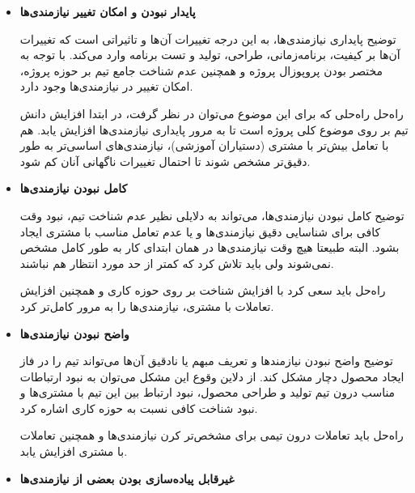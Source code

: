 \begin{itemize}
	
	\item
	\textbf{پایدار نبودن و امکان تغییر نیازمندی‌ها}
	
	
	توضیح \hspace*{1cm}  پایداری نیازمندی‌ها، به این درجه تغییرات آن‌ها و تاثیراتی است که تغییرات آن‌ها بر کیفیت، برنامه‌زمانی، طراحی، تولید و تست برنامه وارد می‌کند. با توجه به مختصر بودن پروپوزال پروژه و همچنین عدم شناخت جامع تیم بر حوزه پروژه،‌ امکان تغییر در نیازمندی‌ها وجود دارد.
	
	
	راه‌حل \hspace*{1cm}  راه‌حلی که برای این موضوع می‌توان در نظر گرفت، در ابتدا افزایش دانش تیم بر روی موضوع کلی پروژه است تا به مرور پایداری نیاز‌مندی‌ها افزایش یابد. هم با تعامل بیش‌تر با مشتری (دستیاران آموزشی)، نیازمندی‌های اساسی‌تر به طور دقیق‌تر مشخص شوند تا احتمال تغییرات ناگهانی آنان کم شود.
	
	\item 
\textbf{کامل نبودن نیازمندی‌ها}
	
	توضیح \hspace*{1cm}  
	کامل نبودن نیازمندی‌ها،  می‌تواند به دلایلی نظیر عدم شناخت تیم، نبود وقت‌ کافی برای شناسایی دقیق نیازمندی‌ها و یا عدم تعامل مناسب با مشتری ایجاد بشود. البته طبیعتا هیچ‌ وقت نیازمندی‌ها در همان ابتدای کار به طور کامل مشخص نمی‌شوند ولی باید تلاش کرد که کمتر از حد مورد انتظار هم نباشند.
	
	راه‌حل \hspace*{1cm}  باید سعی کرد با افزایش شناخت بر روی حوزه کاری و همچنین افزایش تعاملات با مشتری، نیازمندی‌ها را به مرور کامل‌تر کرد.
	
	
	
	\item 
	\textbf{واضح نبودن نیازمندی‌ها}
	
	
	توضیح \hspace*{1cm}  
واضح نبودن نیازمند‌ها و تعریف مبهم یا نادقیق ‌آن‌ها می‌تواند تیم را در فاز ایجاد محصول دچار مشکل کند. از دلاین وقوع این مشکل می‌توان به نبود ارتباطات مناسب درون تیم تولید و طراحی محصول، نبود ارتباط بین این تیم با مشتری‌ها و نبود شناخت کافی نسبت به حوزه کاری اشاره کرد.
	
	راه‌حل \hspace*{1cm}  باید تعاملات درون تیمی برای مشخص‌تر کرن نیازمندی‌ها و همچنین تعاملات با مشتری افزایش یابد.
	
	
	\item 
	\textbf{غیرقابل پیاده‌سازی بودن بعضی از نیازمندی‌ها}
	

\end{itemize}
